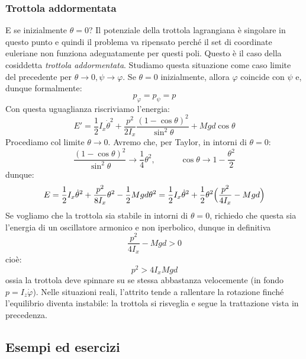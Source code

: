 \documentclass[a4paper,openany]{article}
\begin{document}
	\subsubsection{Trottola addormentata}
	E se inizialmente $\theta = 0$? Il potenziale della trottola lagrangiana è singolare in questo punto e quindi il problema va ripensato perché il set di coordinate euleriane non funziona adeguatamente per questi poli. Questo è il caso della cosiddetta \textit{trottola addormentata}. Studiamo questa situazione come caso limite del precedente per $\theta\to 0, \psi\to\varphi$. Se $\theta=0$ inizialmente, allora $\varphi$ coincide con $\psi$ e, dunque formalmente:
	$$
	p_{\varphi} = p_\psi = p
	$$
	Con questa uguaglianza riscriviamo l'energia:
	$$
	E' = \dfrac{1}{2}I_x\dot{\theta}^2 + \dfrac{p^2}{2I_x}\dfrac{(1-\cos\theta)^2}{\sin^2\theta}+  Mgd\cos\theta
	$$
	Procediamo col limite $\theta\to 0$. Avremo che, per Taylor, in intorni di $\theta=0$:
	$$
	\dfrac{(1-\cos\theta)^2}{\sin^2\theta} \to \dfrac{1}{4}\theta^2, \quad \quad \quad \cos\theta \to 1-\dfrac{\theta^2}{2}
	$$
	dunque:
	$$
	E = \dfrac{1}{2}I_x\dot{\theta}^2 + \dfrac{p^2}{8I_x}\theta^2-\dfrac{1}{2}Mgd\theta^2 =\dfrac{1}{2}I_x\dot{\theta}^2 + \dfrac{1}{2}\theta^2\Bigl(\dfrac{p^2}{4I_x}-Mgd\Bigl)
	$$
	Se vogliamo che la trottola sia stabile in intorni di $\theta=0$, richiedo che questa sia l'energia di un oscillatore armonico e non iperbolico, dunque in definitiva
	\begin{equation}\label{key}
		\dfrac{p^2}{4I_x}-Mgd > 0
	\end{equation}
	cioè:
	\begin{equation}\label{key}
		p^2 > 4I_xMgd
	\end{equation}
	ossia la trottola deve spinnare su se stessa abbastanza velocemente (in fondo $p = I_z\dot\varphi$). Nelle situazioni reali, l'attrito tende a rallentare la rotazione finché l'equilibrio diventa instabile: la trottola si risveglia e segue la trattazione vista in precedenza.
	\newpage 
	\subsection{Esempi ed esercizi}
\end{document}
